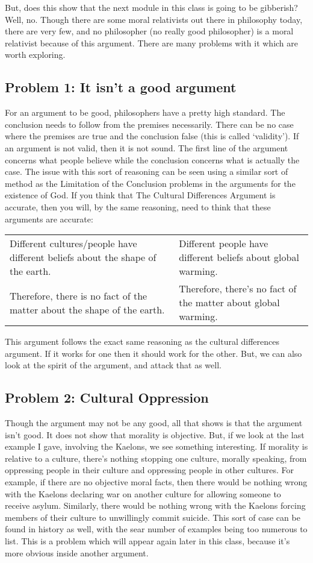 But, does this show that the next module in this class is going to be gibberish? Well, no. Though there are some moral relativists out there in philosophy today, there are very few, and no philosopher (no really good philosopher) is a moral relativist because of this argument. There are many problems with it which are worth exploring. 
\subsection{Problem 1: It isn't a good argument}

For an argument to be good, philosophers have a pretty high standard. The conclusion needs to follow from the premises necessarily. There can be no case where the premises are true and the conclusion false (this is called ‘validity’). If an argument is not valid, then it is not sound. The first line of the argument concerns what people believe while the conclusion concerns what is actually the case. The issue with this sort of reasoning can be seen using a similar sort of method as the Limitation of the Conclusion problems in the arguments for the existence of God. If you think that The Cultural Differences Argument is accurate, then you will, by the same reasoning, need to think that these arguments are accurate: 

\begin{tabular}{p{2in}|p{2in}}
    Different cultures/people have different beliefs about the shape of the earth.& Different people have different beliefs about global warming.\\
    Therefore, there is no fact of the matter about the shape of the earth.&Therefore, there's no fact of the matter about global warming.\\
\end{tabular}

This argument follows the exact same reasoning as the cultural differences argument. If it works for one then it should work for the other. But, we can also look at the spirit of the argument, and attack that as well. 
\subsection{Problem 2: Cultural Oppression}

Though the argument may not be any good, all that shows is that the argument isn't good. It does not show that morality is objective. But, if we look at the last example I gave, involving the Kaelons, we see something interesting. If morality is relative to a culture, there's nothing stopping one culture, morally speaking, from oppressing people in their culture and oppressing people in other cultures. For example, if there are no objective moral facts, then there would be nothing wrong with the Kaelons declaring war on another culture for allowing someone to receive asylum. Similarly, there would be nothing wrong with the Kaelons forcing members of their culture to unwillingly commit suicide. This sort of case can be found in history as well, with the sear number of examples being too numerous to list. This is a problem which will appear again later in this class, because it's more obvious inside another argument.  

